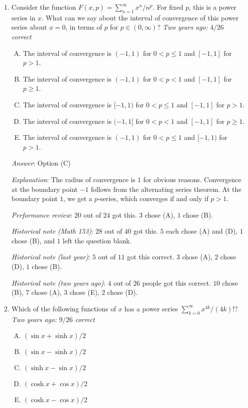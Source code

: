 \documentclass[10pt]{amsart}
\begin{document}
\begin{enumerate}
\item Consider the function $F(x,p) = \sum_{n=1}^\infty x^n/n^p$. For
  fixed $p$, this is a power series in $x$. What can we say about the
  interval of convergence of this power series about $x = 0$, in terms
  of $p$ for $p \in (0,\infty)$? {\em Two years ago: $4/26$ correct}
  \begin{enumerate}[(A)]
  \item The interval of convergence is $(-1,1)$ for $0 < p \le 1$ and
    $[-1,1]$ for $p > 1$.
  \item The interval of convergence is $(-1,1)$ for $0 < p < 1$ and
    $[-1,1]$ for $p \ge 1$.
  \item The interval of convergence is $[-1,1)$ for $0 < p \le 1$ and
    $[-1,1]$ for $p > 1$.
  \item The interval of convergence is $(-1,1]$ for $0 < p < 1$ and
    $[-1,1]$ for $p \ge 1$.
  \item The interval of convergence is $(-1,1)$ for $0 < p \le 1$ and
    $[-1,1)$ for $p > 1$.
  \end{enumerate}

  {\em Answer}: Option (C)

  {\em Explanation}: The radius of convergence is $1$ for obvious
  reasons. Convergence at the boundary point $-1$ follows from the
  alternating series theorem. At the boundary point $1$, we get a
  $p$-series, which converges if and only if $p > 1$.

  {\em Performance review}: $20$ out of $24$ got this. $3$ chose (A),
  $1$ chose (B).

  {\em Historical note (Math 153)}: $28$ out of $40$ got this. $5$ each chose
  (A) and (D), $1$ chose (B), and $1$ left the question blank.

  {\em Historical note (last year)}: $5$ out of $11$ got this correct. $3$
  chose (A), $2$ chose (D), $1$ chose (B).

  {\em Historical note (two years ago)}: $4$ out of $26$ people got this
  correct. $10$ chose (B), $7$ chose (A), $3$ chose (E), $2$ chose
  (D).

\item Which of the following functions of $x$ has a power series
  $\sum_{k=0}^\infty x^{4k}/(4k)!$? {\em Two years ago: $9/26$ correct}
  \begin{enumerate}[(A)]
  \item $(\sin x + \sinh x)/2$
  \item $(\sin x - \sinh x)/2$
  \item $(\sinh x - \sin x)/2$
  \item $(\cosh x + \cos x)/2$
  \item $(\cosh x - \cos x)/2$
  \end{enumerate}


\end{enumerate}
\end{document}

